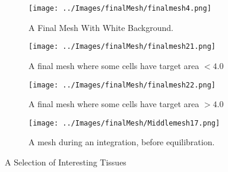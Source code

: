 \begin{figure}[h]
    \centering
    \begin{subfigure}[b]{0.4\textwidth}
        \centering
        \texttt{[image: ../Images/finalMesh/finalmesh4.png]}
        \caption{A Final Mesh With White Background.}
        \label{fig:whitebg}
    \end{subfigure}
    \hfill
    \begin{subfigure}[b]{0.4\textwidth}
        \centering
        \texttt{[image: ../Images/finalMesh/finalmesh21.png]}
        \caption{A final mesh where some cells have target area $< 4.0$}
        \label{fig:small area}
    \end{subfigure}
    \hfill
    \begin{subfigure}[b]{0.4\textwidth}
        \centering
        \texttt{[image: ../Images/finalMesh/finalmesh22.png]}
        \caption{A final mesh where some cells have target area $>4.0$}
        \label{fig:large area}
    \end{subfigure}
    \hfill
    \begin{subfigure}[b]{0.4\textwidth}
        \centering
        \texttt{[image: ../Images/finalMesh/Middlemesh17.png]}
        \caption{A mesh during an integration, before equilibration.}
        \label{fig:whitebg2}
    \end{subfigure}
    \caption{A Selection of Interesting Tissues}
    \label{fig:Interesting tissue}
\end{figure}
